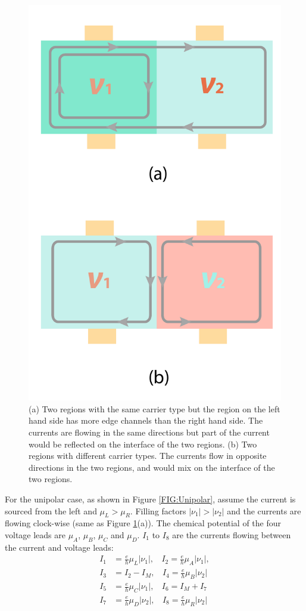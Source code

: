 \documentclass[pdflatex, sectionletters, 12pt]{pittetd}    %
\begin{document}
\begin{figure}[h!]
	\centering
	\includegraphics[width=.4\textwidth]{Drawing/Mixing.pdf}
	\caption{(a) Two regions with the same carrier type but the region on the left hand side has more edge channels than the right hand side. The currents are flowing in the same directions but part of the current would be reflected on the interface of the two regions. (b) Two regions with different carrier types. The currents flow in opposite directions in the two regions, and would mix on the interface of the two regions.}
	\label{FIG:Mixing}
\end{figure}

For the unipolar case, as shown in Figure \ref{FIG:Unipolar}, assume the current is sourced from the left and $\mu_L > \mu_R$. Filling factors $|\nu_1| > |\nu_2|$ and the currents are flowing clock-wise (same as Figure \ref{FIG:Mixing}(a)). The chemical potential of the four voltage leads are $\mu_A$, $\mu_B$, $\mu_C$ and $\mu_D$. $I_1$ to $I_8$ are the currents flowing between the current and voltage leads:
\begin{equation}
\label{EQN:MixCurr1}
	\begin{split}
		I_1 & = \frac{e}{h}\mu_L|\nu_1|, \ \ \ \  I_2 = \frac{e}{h}\mu_A|\nu_1|, \\
		I_3 & = I_2 - I_M, \ \ \ \ I_4 = \frac{e}{h}\mu_B|\nu_2| \\
		I_5 & = \frac{e}{h}\mu_C|\nu_1|, \ \ \ \ I_6 = I_M + I_7 \\
		I_7 & = \frac{e}{h}\mu_D|\nu_2|, \ \ \ \ I_8 = \frac{e}{h}\mu_R|\nu_2|
	\end{split}
\end{equation}
\end{document}
